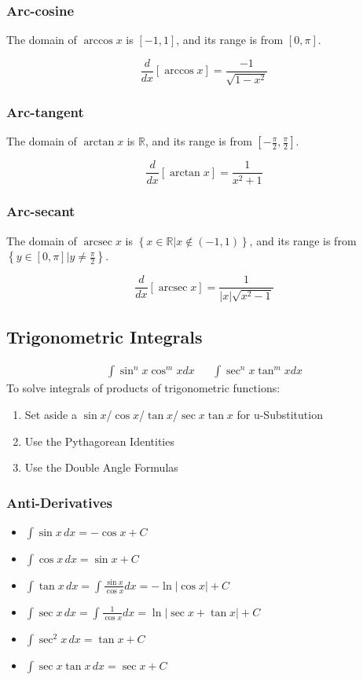 \documentclass{article}
\DeclareMathOperator{\arcsec}{arcsec}
\begin{document}
\subsubsection{Arc-cosine}
The domain of $\arccos{x}$ is $[-1,1]$, and its range is from $[0, \pi]$.

$$\frac{d}{dx}\left[\arccos{x}\right]=\frac{-1}{\sqrt{1-x^2}}$$

\subsubsection{Arc-tangent}
The domain of $\arctan{x}$ is $\mathbb{R}$, and its range is from $[-\frac{\pi}{2},\frac{\pi}{2}]$.

$$\frac{d}{dx}\left[\arctan{x}\right]=\frac{1}{x^2+1}$$

\subsubsection{Arc-secant}
The domain of $\arcsec{x}$ is $\left\{x\in\mathbb{R}|x\notin(-1,1)\right\}$, and its range is from $\left\{y\in[0,\pi]|y\ne\frac{\pi}{2}\right\}$.

$$\frac{d}{dx}\left[\arcsec{x}\right]=\frac{1}{|x|\sqrt{x^2-1}}$$

\subsection{Trigonometric Integrals}
\begin{align*}
    \int \sin^n{x}\cos^m{x}dx && \int \sec^n{x}\tan^m{x}dx
\end{align*}
To solve integrals of products of trigonometric functions:
\begin{enumerate}
    \item Set aside a $\sin{x}$/$\cos{x}$/$\tan{x}$/$\sec{x}\tan{x}$ for u-Substitution
    \item Use the Pythagorean Identities
    \item Use the Double Angle Formulas
\end{enumerate}

\subsubsection{Anti-Derivatives}
\begin{itemize}
    \item $\int\sin{x}\,dx=-\cos{x}+C$
    \item $\int\cos{x}\,dx=\sin{x}+C$
    \item $\int\tan{x}\,dx=\int\frac{\sin{x}}{\cos{x}}dx=-\ln{|\cos{x}|}+C$
    \item $\int\sec{x}\,dx=\int\frac{1}{\cos{x}}dx=\ln{|\sec{x}+\tan{x}|}+C$
    \item $\int\sec^2{x}\,dx=\tan{x}+C$
    \item $\int\sec{x}\tan{x}\,dx=\sec{x}+C$
\end{itemize}
\end{document}
